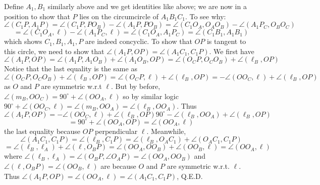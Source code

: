 \documentclass[11pt,a4paper]{article}
\begin{document}
\begin{enumerate}
	Define $A_1, B_1$ similarly above and we get identities like above; we are now in a position to show that $P$ lies on the circumcircle of $A_1B_1C_1$. To see why: 
	\[
	\angle(C_1P, A_1P)
	=\angle(C_1P, PO_B)-\angle(A_1P, PO_B)
	=\angle(C_1O_A, O_AO_B)-\angle(A_1P_C, O_BO_C)
	\]\[
	=\angle(C_1O_A, \ell)-\angle(A_1P_C, \ell)
	=\angle(C_1O_A, A_1P_C)
	=\angle(C_1B_1, A_1B_1)
	\]
	which shows $C_1, B_1, A_1, P$ are indeed concyclic. 
	To show that $OP$ is tangent to this circle, we need to show that $\angle(A_1P, OP)=\angle(A_1C_1, C_1P)$. 
	We first have 
	\[
	\angle(A_1P, OP)
	=\angle(A_1P, A_1O_B)+\angle(A_1O_B, OP)
	=\angle(O_CP, O_CO_B)+\angle(\ell_B, OP)
	\]
	Notice that the last equality is the same as $\angle(O_CP, O_CO_B)+\angle(\ell_B, OP)=\angle(O_CP, \ell)+\angle(\ell_B, OP)=-\angle(OO_C, \ell)+\angle(\ell_B, OP)$ as $O$ and $P$ are symmetric w.r.t $\ell$. 
	But by before, $\angle(m_B, OO_C)=90^{\circ}+\angle(OO_A, \ell)$ so by similar logic $90^{\circ}+\angle(OO_C, \ell)=\angle(m_B, OO_A)=\angle(\ell_B, OO_A)$. Thus 
	\[
	\angle(A_1P, OP)=-\angle(OO_C, \ell)+\angle(\ell_B, OP)
	90^{\circ}-\angle(\ell_B, OO_A)+\angle(\ell_B, OP)
	\]\[
	=90^{\circ}+\angle(OO_A, OP)
	=\angle(OO_A, \ell)
	\]
	the last equality because $OP$ perpendicular $\ell$. 
	Meanwhile, 
	\[
	\angle(A_1C_1, C_1P)
	=\angle(\ell_B, C_1P)
	=\angle(\ell_B, O_AC_1)+\angle (O_AC_1, C_1P)
	\]\[
	=\angle(\ell_B, \ell_A)+\angle (\ell, O_BP)
	=\angle(OO_A, OO_B)+\angle (OO_B, \ell)
	=\angle(OO_A, \ell)
	\]
	where $\angle(\ell_B, \ell_A)=\angle(O_BP, \angle O_AP)=\angle(OO_A, OO_B)$ and $\angle (\ell, O_BP)=\angle (OO_B, \ell)$ are because $O$ and $P$ are symmetric w.r.t. $\ell$. Thus $\angle(A_1P, OP)=\angle(OO_A, \ell)=\angle(A_1C_1, C_1P)$, Q.E.D. 
	\end{enumerate}
\end{document}
